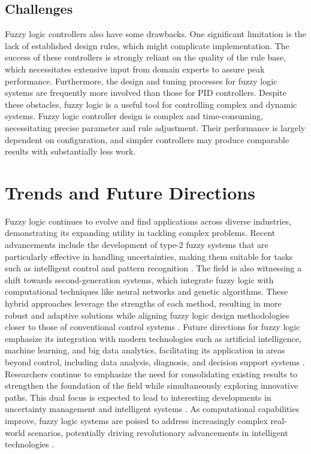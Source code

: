 \documentclass[a4paper,12pt]{report}
\begin{document}
\section{Challenges}
Fuzzy logic controllers also have some drawbacks. One significant limitation is the lack of established design rules, which might complicate implementation. The success of these controllers is strongly reliant on the quality of the rule base, which necessitates extensive input from domain experts to assure peak performance. Furthermore, the design and tuning processes for fuzzy logic systems are frequently more involved than those for PID controllers. Despite these obstacles, fuzzy logic is a useful tool for controlling complex and dynamic systems\cite{diouf2021comparative}.
Fuzzy logic controller design is complex and time-consuming, necessitating precise parameter and rule adjustment. Their performance is largely dependent on configuration, and simpler controllers may produce comparable results with substantially less work\cite{ashbaughadvantages}.

\chapter{Trends and Future Directions}
Fuzzy logic continues to evolve and find applications across diverse industries, demonstrating its expanding utility in tackling complex problems. Recent advancements include the development of type-2 fuzzy systems that are particularly effective in handling uncertainties, making them suitable for tasks such as intelligent control and pattern recognition \cite{mittal2020comprehensive}. The field is also witnessing a shift towards second-generation systems, which integrate fuzzy logic with computational techniques like neural networks and genetic algorithms. These hybrid approaches leverage the strengths of each method, resulting in more robust and adaptive solutions while aligning fuzzy logic design methodologies closer to those of conventional control systems . Future directions for fuzzy logic emphasize its integration with modern technologies such as artificial intelligence, machine learning, and big data analytics, facilitating its application in areas beyond control, including data analysis, diagnosis, and decision support systems \cite{chalamalasetty2024envisioning}. Researchers continue to emphasize the need for consolidating existing results to strengthen the foundation of the field while simultaneously exploring innovative paths. This dual focus is expected to lead to interesting developments in uncertainty management and intelligent systems \cite{tabacchi2015future}. As computational capabilities improve, fuzzy logic systems are poised to address increasingly complex real-world scenarios, potentially driving revolutionary advancements in intelligent technologies \cite{chalamalasetty2024envisioning}.
\end{document}

